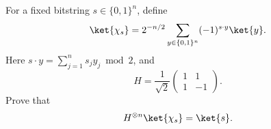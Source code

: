For a fixed bitstring $s\in\{0,1\}^n$, define
$$
    \ket{\chi_s}=2^{-n/2}\sum_{y\in\{0,1\}^n}(-1)^{s\cdot y}\ket{y}.
$$
Here $s\cdot y=\sum_{j=1}^ns_jy_j\bmod2$, and
$$
    H=\frac1{\sqrt2}\begin{pmatrix}1&1\\1&-1\end{pmatrix}.
$$
Prove that
$$
    H^{\otimes n}\ket{\chi_s}=\ket{s}.
$$
